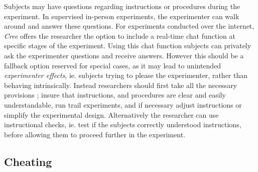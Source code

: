 \documentclass[preprint, 12pt]{elsarticle}
\newcommand{\Cree}{\emph{Cree}\xspace}
\begin{document}
Subjects may have questions regarding instructions or procedures during the experiment. In supervised in-person experiments, the experimenter can walk around and answer these questions. For experiments conducted over the internet, \Cree offers the researcher the option to include a real-time chat function at specific stages of the experiment. Using this chat function subjects can privately ask the experimenter questions and receive answers. However this should be a fallback option reserved for special cases, as it may lead to unintended \emph{experimenter effects}, ie. subjects trying to please the experimenter, rather than behaving intrinsically. Instead researchers should first take all the necessary provisions \citep{Guala_2005}; insure that instructions, and procedures are clear and easily understandable, run trail experiments, and if necessary adjust instructions or simplify the experimental design. Alternatively the researcher can use instructional checks, ie. test if the subjects correctly understood instructions, before allowing them to proceed further in the experiment.

\subsection{Cheating}
\end{document}
